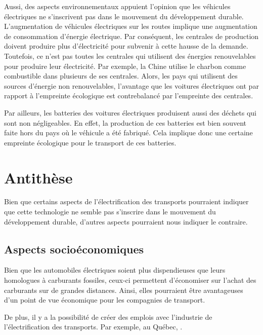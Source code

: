 Aussi, des aspects environnementaux appuient l'opinion que les véhicules électriques ne s'inscrivent pas dans le mouvement du développement durable. L'augmentation de véhicules électriques sur les routes implique une augmentation de consommation d'énergie électrique. Par conséquent, les centrales de production doivent produire plus d'électricité pour subvenir à cette hausse de la demande. Toutefois, ce n'est pas toutes les centrales qui utilisent des énergies renouvelables pour produire leur électricité. Par exemple, la Chine utilise le charbon comme combustible dans plusieurs de ses centrales. Alors, les pays qui utilisent des sources d'énergie non renouvelables, l'avantage que les voitures électriques ont par rapport à l'empreinte écologique est contrebalancé par l'empreinte des centrales. 

Par ailleurs, les batteries des voitures électriques produisent aussi des déchets qui sont non négligeables. En effet, la production de ces batteries est bien souvent faite hors du pays où le véhicule a été fabriqué. Cela implique donc une certaine empreinte écologique pour le transport de ces batteries.

\section{Antithèse}

Bien que certains aspects de l'électrification des transports pourraient indiquer que cette technologie ne semble pas s'inscrire dans le mouvement du développement durable, d'autres aspects pourraient nous indiquer le contraire. 

\subsection{Aspects socioéconomiques}

Bien que les automobiles électriques soient plus dispendieuses que leurs homologues à carburants fossiles, ceux-ci permettent d'économiser sur l'achat des carburants sur de grandes distances. Ainsi, elles pourraient être avantageuses d'un point de vue économique pour les compagnies de transport. 

De plus, il y a la possibilité de créer des emplois avec l'industrie de l'électrification des transports. Par exemple, au Québec, .


